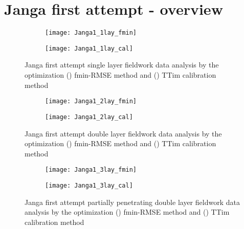 \clearpage\section{Janga first attempt - overview}
\label{sec:Janga1_overview}

\begin{figure}[h!]
	\centering
	\begin{subfigure}[b]{\linewidth}
		\centering\texttt{[image: Janga1\_1lay\_fmin]}
		\captionsetup{justification=centering}		
		\caption{\label{fig:Janga1_1lay_fmin}}
		\end{subfigure}\vfill
	\begin{subfigure}[b]{\linewidth}
		\centering\texttt{[image: Janga1\_1lay\_cal]}
		\captionsetup{justification=centering}		
		\caption{\label{fig:Janga1_1lay_cal}}
		\end{subfigure}
	\captionsetup{justification=centering}	
	\caption{Janga first attempt single layer fieldwork data analysis by the optimization () fmin-RMSE method and () TTim calibration method} 
	\label{fig:Janga1_1lay_analysis}
\end{figure} 

\begin{figure}[h!]
	\centering
	\begin{subfigure}[b]{\linewidth}
		\centering\texttt{[image: Janga1\_2lay\_fmin]}
		\captionsetup{justification=centering}		
		\caption{\label{fig:Janga1_2lay_fmin}}
		\end{subfigure}\vfill
	\begin{subfigure}[b]{\linewidth}
		\centering\texttt{[image: Janga1\_2lay\_cal]}
		\captionsetup{justification=centering}		
		\caption{\label{fig:Janga1_2lay_cal}}
		\end{subfigure}
	\captionsetup{justification=centering}	
	\caption{Janga first attempt double layer fieldwork data analysis by the optimization () fmin-RMSE method and () TTim calibration method} 
	\label{fig:Janga1_2lay_analysis}
\end{figure} 

\begin{figure}[h!]
	\centering
	\begin{subfigure}[b]{\linewidth}
		\centering\texttt{[image: Janga1\_3lay\_fmin]}
		\captionsetup{justification=centering}		
		\caption{\label{fig:Janga1_3lay_fmin}}
		\end{subfigure}\vfill
	\begin{subfigure}[b]{\linewidth}
		\centering\texttt{[image: Janga1\_3lay\_cal]}
		\captionsetup{justification=centering}		
		\caption{\label{fig:Janga1_3lay_cal}}
		\end{subfigure}
	\captionsetup{justification=centering}	
	\caption{Janga first attempt partially penetrating double layer fieldwork data analysis by the optimization () fmin-RMSE method and () TTim calibration method} 
	\label{fig:Janga1_3lay_analysis}
\end{figure} 

